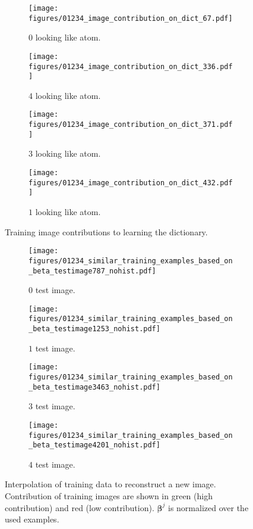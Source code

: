 \documentclass[10pt]{article} %
\newcommand{\boldbeta}{{\bm \beta}}
\begin{document}
\begin{figure}[h]
    \centering
  \begin{subfigure}[b]{0.245\textwidth}
  \centering
  \texttt{[image: figures/01234\_image\_contribution\_on\_dict\_67.pdf]}
  \caption{$0$ looking like atom.}
  \end{subfigure}
  \begin{subfigure}[b]{0.245\textwidth}
  \centering
  \texttt{[image: figures/01234\_image\_contribution\_on\_dict\_336.pdf]}
   \caption{$4$ looking like atom.}
  \end{subfigure}
  \begin{subfigure}[b]{0.245\textwidth}
  \centering
  \texttt{[image: figures/01234\_image\_contribution\_on\_dict\_371.pdf]}
    \caption{$3$ looking like atom.}
  \end{subfigure}
   \begin{subfigure}[b]{0.245\textwidth}
  \centering
  \texttt{[image: figures/01234\_image\_contribution\_on\_dict\_432.pdf]}
    \caption{$1$ looking like atom.}
  \end{subfigure}
  \caption{Training image contributions to learning the dictionary.}
  \label{fig:mnist_01234_learn_image_cont_to_dict}
  \vspace{-3mm}
\end{figure}
%
%
\begin{figure}[h]
  \centering
  \begin{subfigure}[b]{0.245\textwidth}
  \centering
  \texttt{[image: figures/01234\_similar\_training\_examples\_based\_on\_beta\_testimage787\_nohist.pdf]}
  \caption{$0$ test image.}
  \end{subfigure}
  \begin{subfigure}[b]{0.245\textwidth}
  \centering
  \texttt{[image: figures/01234\_similar\_training\_examples\_based\_on\_beta\_testimage1253\_nohist.pdf]}
  \caption{$1$ test image.}
  \end{subfigure}
  \begin{subfigure}[b]{0.245\textwidth}
  \centering
  \texttt{[image: figures/01234\_similar\_training\_examples\_based\_on\_beta\_testimage3463\_nohist.pdf]}
  \caption{$3$ test image.}
  \end{subfigure}
   \begin{subfigure}[b]{0.245\textwidth}
  \centering
  \texttt{[image: figures/01234\_similar\_training\_examples\_based\_on\_beta\_testimage4201\_nohist.pdf]}
  \caption{$4$ test image.}
  \end{subfigure}
  \caption{Interpolation of training data to reconstruct a new image. Contribution of training images are shown in green (high contribution) and red (low contribution). $\boldbeta^j$ is normalized over the used examples.}
  \label{fig:mnist_01234_learn_interpolate_gz}
 \vspace{-3mm}
\end{figure}
%
\end{document}
